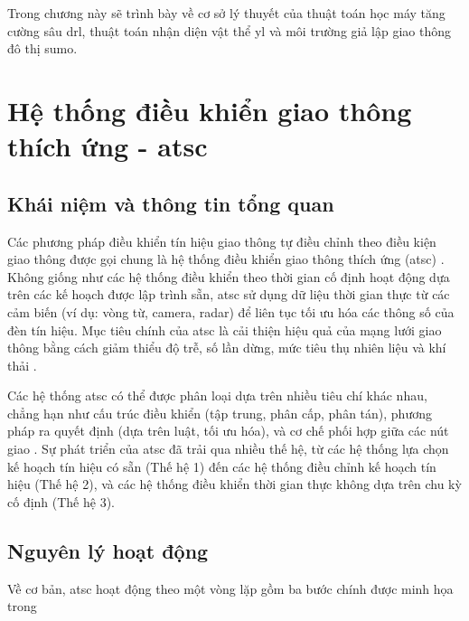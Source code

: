 Trong chương này sẽ trình bày về cơ sở lý thuyết của thuật toán học máy tăng
cường sâu \ac{drl}, thuật toán nhận diện vật thể \ac{yl} và môi trường giả lập giao
thông đô thị \ac{sumo}.

\section{Hệ thống điều khiển giao thông thích ứng - \ac{atsc}}
\subsection{Khái niệm và thông tin tổng quan}
Các phương pháp điều khiển tín hiệu giao thông tự điều chỉnh theo điều kiện giao
thông được gọi chung là hệ thống điều khiển giao thông thích ứng (\ac{atsc}) \cite{Shams2023}.
Không giống như các hệ thống điều khiển theo thời gian cố định hoạt động dựa
trên các kế hoạch được lập trình sẵn, \ac{atsc} sử dụng dữ liệu thời gian thực
từ các cảm biến (ví dụ: vòng từ, camera, radar) để liên tục tối ưu hóa các thông
số của đèn tín hiệu. Mục tiêu chính của \ac{atsc} là cải thiện hiệu quả của mạng
lưới giao thông bằng cách giảm thiểu độ trễ, số lần dừng, mức tiêu thụ nhiên liệu
và khí thải \cite{Stevanovic2010}.

Các hệ thống \ac{atsc} có thể được phân loại dựa trên nhiều tiêu chí khác nhau, chẳng
hạn như cấu trúc điều khiển (tập trung, phân cấp, phân tán), phương pháp ra
quyết định (dựa trên luật, tối ưu hóa), và cơ chế phối hợp giữa các nút giao
\cite{Shams2023}. Sự phát triển của \ac{atsc} đã trải qua nhiều thế hệ, từ các hệ
thống lựa chọn kế hoạch tín hiệu có sẵn (Thế hệ 1) đến các hệ thống điều chỉnh kế
hoạch tín hiệu (Thế hệ 2), và các hệ thống điều khiển thời gian thực không dựa
trên chu kỳ cố định (Thế hệ 3).
\subsection{Nguyên lý hoạt động}
Về cơ bản, \ac{atsc} hoạt động theo một vòng lặp gồm ba bước chính được minh họa trong 


